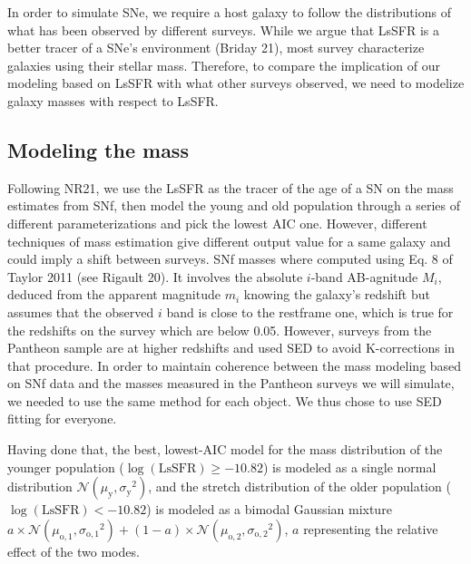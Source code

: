 \documentclass[]{aa}
\begin{document}
In order to simulate SNe, we require a host galaxy to follow the distributions
of what has been observed by different surveys. While we argue that LsSFR is a
better tracer of a SNe's environment (Briday 21), most survey characterize
galaxies using their stellar mass. Therefore, to compare the implication of our
modeling based on LsSFR with what other surveys observed, we need to modelize
galaxy masses with respect to LsSFR.

\subsection{Modeling the mass}

Following NR21, we use the LsSFR as the tracer of the age of a SN on the mass
estimates from SNf, then model the young and old population through a series of
different parameterizations and pick the lowest AIC one. However, different
techniques of mass estimation give different output value for a same galaxy and
could imply a shift between surveys. SNf masses where computed using Eq. 8 of
Taylor 2011 (see Rigault 20). It involves the absolute $i$-band AB-agnitude
$M_i$, deduced from the apparent magnitude $m_i$ knowing the galaxy's redshift
but assumes that the observed $i$ band is close to the restframe one, which is
true for the redshifts on the survey which are below 0.05. However, surveys from
the Pantheon sample are at higher redshifts and used SED to avoid K-corrections
in that procedure. In order to maintain coherence between the mass modeling
based on SNf data and the masses measured in the Pantheon surveys we will
simulate, we needed to use the same method for each object. We thus chose to use
SED fitting for everyone.

Having done that, the best, lowest-AIC model for the mass distribution of the
younger population ($\log(\mathrm{LsSFR})\geq-10.82$) is modeled as a single
normal distribution $\mathcal{N}(\mu_\mathrm{y}, \sigma_\mathrm{y}{}^2)$, and
the stretch distribution of the older population ($\log(\mathrm{LsSFR})<-10.82$)
is modeled as a bimodal Gaussian mixture $a\times \mathcal{N}(\mu_\mathrm{o,1},
\sigma_\mathrm{o,1}{}^2) + (1-a)\times \mathcal{N}(\mu_\mathrm{o,2},
\sigma_\mathrm{o,2}{}^2)$, $a$ representing the relative effect of the two
modes.
\end{document}
